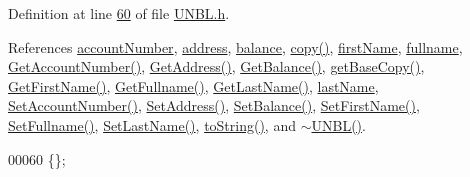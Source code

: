 Definition at line \hyperlink{_u_n_b_l_8h_source_l00060}{60} of file \hyperlink{_u_n_b_l_8h_source}{U\+N\+B\+L.\+h}.



References \hyperlink{_u_n_b_l_8h_source_l00093}{account\+Number}, \hyperlink{_u_n_b_l_8h_source_l00095}{address}, \hyperlink{_u_n_b_l_8h_source_l00094}{balance}, \hyperlink{_u_n_b_l_8cpp_source_l00033}{copy()}, \hyperlink{_u_n_b_l_8h_source_l00091}{first\+Name}, \hyperlink{_u_n_b_l_8h_source_l00090}{fullname}, \hyperlink{_u_n_b_l_8cpp_source_l00075}{Get\+Account\+Number()}, \hyperlink{_u_n_b_l_8cpp_source_l00059}{Get\+Address()}, \hyperlink{_u_n_b_l_8cpp_source_l00067}{Get\+Balance()}, \hyperlink{_u_n_b_l_8cpp_source_l00021}{get\+Base\+Copy()}, \hyperlink{_u_n_b_l_8cpp_source_l00091}{Get\+First\+Name()}, \hyperlink{_u_n_b_l_8cpp_source_l00099}{Get\+Fullname()}, \hyperlink{_u_n_b_l_8cpp_source_l00083}{Get\+Last\+Name()}, \hyperlink{_u_n_b_l_8h_source_l00092}{last\+Name}, \hyperlink{_u_n_b_l_8cpp_source_l00071}{Set\+Account\+Number()}, \hyperlink{_u_n_b_l_8cpp_source_l00055}{Set\+Address()}, \hyperlink{_u_n_b_l_8cpp_source_l00063}{Set\+Balance()}, \hyperlink{_u_n_b_l_8cpp_source_l00087}{Set\+First\+Name()}, \hyperlink{_u_n_b_l_8cpp_source_l00095}{Set\+Fullname()}, \hyperlink{_u_n_b_l_8cpp_source_l00079}{Set\+Last\+Name()}, \hyperlink{_u_n_b_l_8cpp_source_l00050}{to\+String()}, and \hyperlink{_u_n_b_l_8cpp_source_l00014}{$\sim$\+U\+N\+B\+L()}.


\begin{DoxyCode}
00060 \{\};
\end{DoxyCode}


